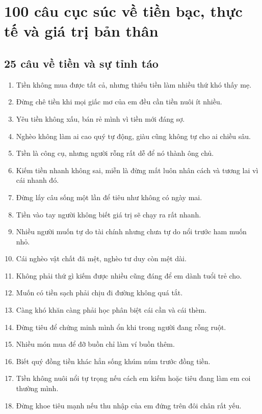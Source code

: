 \chapter{100 câu cục súc về tiền bạc, thực tế và giá trị bản thân}

\section{25 câu về tiền và sự tỉnh táo}
\begin{enumerate}[leftmargin=*]
\item Tiền không mua được tất cả, nhưng thiếu tiền làm nhiều thứ khó thấy mẹ.
\item Đừng chê tiền khi mọi giấc mơ của em đều cần tiền nuôi ít nhiều.
\item Yêu tiền không xấu, bán rẻ mình vì tiền mới đáng sợ.
\item Nghèo không làm ai cao quý tự động, giàu cũng không tự cho ai chiều sâu.
\item Tiền là công cụ, nhưng người rỗng rất dễ để nó thành ông chủ.
\item Kiếm tiền nhanh không sai, miễn là đừng mất luôn nhân cách và tương lai vì cái nhanh đó.
\item Đừng lấy câu sống một lần để tiêu như không có ngày mai.
\item Tiền vào tay người không biết giá trị sẽ chạy ra rất nhanh.
\item Nhiều người muốn tự do tài chính nhưng chưa tự do nổi trước ham muốn nhỏ.
\item Cái nghèo vật chất đã mệt, nghèo tư duy còn mệt dài.
\item Không phải thứ gì kiếm được nhiều cũng đáng để em dành tuổi trẻ cho.
\item Muốn có tiền sạch phải chịu đi đường không quá tắt.
\item Càng khó khăn càng phải học phân biệt cái cần và cái thèm.
\item Đừng tiêu để chứng minh mình ổn khi trong người đang rỗng ruột.
\item Nhiều món mua để đỡ buồn chỉ làm ví buồn thêm.
\item Biết quý đồng tiền khác hẳn sống khúm núm trước đồng tiền.
\item Tiền không nuôi nổi tự trọng nếu cách em kiếm hoặc tiêu đang làm em coi thường mình.
\item Đừng khoe tiêu mạnh nếu thu nhập của em đứng trên đôi chân rất yếu.

\end{enumerate}

